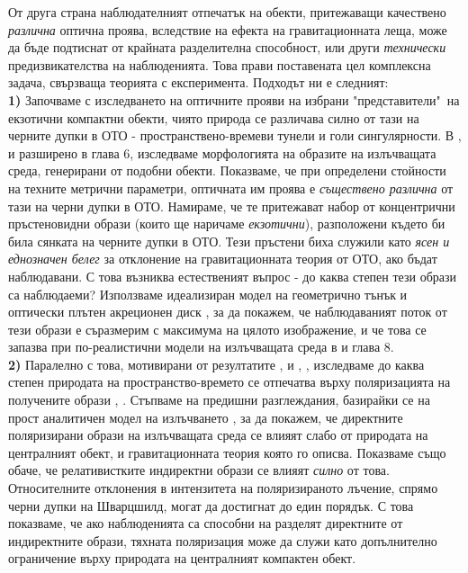 \noindent От друга страна наблюдателният отпечатък на обекти, притежаващи качествено \emph{различна} оптична проява, вследствие на ефекта на гравитационната леща, може да бъде подтиснат от крайната разделителна способност, или други \emph{технически} предизвикателства на наблюденията. Това прави поставената цел комплексна задача, свързваща теорията с експеримента. Подходът ни е следният:\\

\textbf{1)} Започваме с изследването на оптичните прояви на избрани "представители"$\,$ на екзотични компактни обекти, чиято природа се различава силно от тази на черните дупки в ОТО - пространствено-времеви тунели и голи сингулярности. В \cite{Deliyski2022}, и разширено в глава 6, изследваме морфологията на образите на излъчващата среда, генерирани от подобни обекти. Показваме, че при определени стойности на техните метрични параметри, оптичната им проява е \emph{съществено различна} от тази на черни дупки в ОТО. Намираме, че те притежават набор от концентрични пръстеновидни образи (които ще наричаме \emph{екзотични}), разположени където би била сянката на черните дупки в ОТО. Тези пръстени биха служили като \emph{ясен и еднозначен белег} за отклонение на гравитационната теория от ОТО, ако бъдат наблюдавани. С това възниква естественият въпрос - до каква степен тези образи са наблюдаеми? Използваме идеализиран модел на геометрично тънък и оптически плътен акреционен диск \cite{Page1973}, за да покажем, че наблюдаваният поток от тези образи е съразмерим с максимума на цялото изображение, и че това се запазва при по-реалистични модели на излъчващата среда в \cite{Deliyski2024} и глава 8.\\

\textbf{2)} Паралелно с това, мотивирани от резултатите \cite{EHT_M87_VII}, \cite{EHT_M87_VIII} и \cite{EHT_SGR_VII}, \cite{EHT_SGR_VIII}, изследваме до каква степен природата на пространство-времето се отпечатва върху поляризацията на получените образи \cite{Delijski2022}, \cite{Deliyski2023}. Стъпваме на предишни разглеждания, базирайки се на прост аналитичен модел на излъчването \cite{Narayan2021} \cite{Gelles2021}, за да покажем, че директните поляризирани образи на излъчващата среда се влияят слабо от природата на централният обект, и гравитационната теория която го описва. Показваме също обаче, че релативистките индиректни образи се влияят \emph{силно} от това. Относителните отклонения в интензитета на поляризираното лъчение, спрямо черни дупки на Шварцшилд, могат да достигнат до един порядък. С това показваме, че ако наблюденията са способни на разделят директните от индиректните образи, тяхната поляризация може да служи като допълнително ограничение върху природата на централният компактен обект.\\

